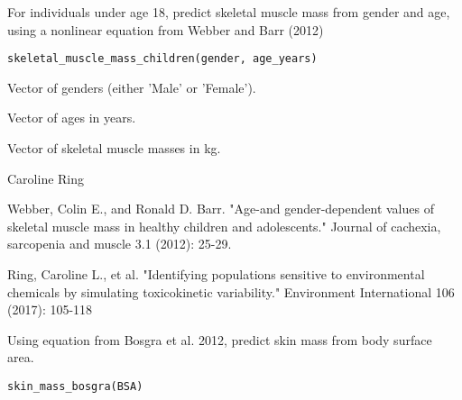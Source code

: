 \documentclass[a4paper]{book}
\begin{document}
%
\begin{Description}\relax
For individuals under age 18, predict skeletal muscle mass from gender and
age, using a nonlinear equation from Webber and Barr (2012)
\end{Description}
%
\begin{Usage}
\begin{verbatim}
skeletal_muscle_mass_children(gender, age_years)
\end{verbatim}
\end{Usage}
%
\begin{Arguments}
\begin{ldescription}
\item[\code{gender}] Vector of genders (either 'Male' or 'Female').

\item[\code{age\_years}] Vector of ages in years.
\end{ldescription}
\end{Arguments}
%
\begin{Value}
Vector of skeletal muscle masses in kg.
\end{Value}
%
\begin{Author}\relax
Caroline Ring
\end{Author}
%
\begin{References}\relax
Webber, Colin E., and Ronald D. Barr. "Age-and gender-dependent values of 
skeletal muscle mass in healthy children and adolescents." Journal of 
cachexia, sarcopenia and muscle 3.1 (2012): 25-29.

Ring, Caroline L., et al. "Identifying populations sensitive to
environmental chemicals by simulating toxicokinetic variability."
Environment International 106 (2017): 105-118
\end{References}
%
\begin{Description}\relax
Using equation from Bosgra et al. 2012, predict skin mass from body surface
area.
\end{Description}
%
\begin{Usage}
\begin{verbatim}
skin_mass_bosgra(BSA)
\end{verbatim}
\end{Usage}
\end{document}
